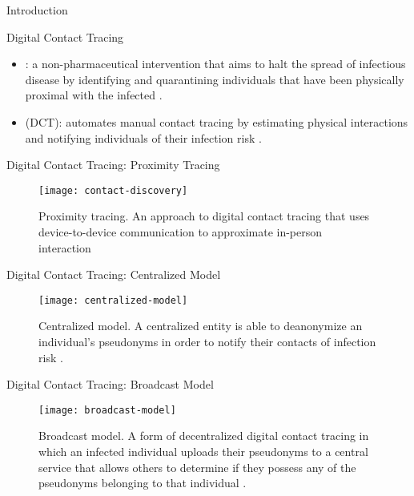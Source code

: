 \documentclass[11pt]{beamer}
\begin{document}
\begin{frame}
	\maketitle
\end{frame}

\begin{section}{Introduction}

\begin{frame}{Digital Contact Tracing}
\begin{itemize}
  \item {}: a non-pharmaceutical intervention that aims to halt the spread of infectious disease by identifying and quarantining individuals that have been physically proximal with the infected \citep{PozoMartin2023}.
  \item {} (DCT): automates manual contact tracing by estimating physical interactions and notifying individuals of their infection risk \citep{Reichert2021}.
\end{itemize}
\end{frame}

\begin{frame}{Digital Contact Tracing: Proximity Tracing}
\begin{figure}
  \centering
  \texttt{[image: contact-discovery]}
  \caption[Proximity tracing]{Proximity tracing. An approach to digital contact tracing that uses device-to-device communication to approximate in-person interaction \cite{Reichert2021}}
\end{figure}
\end{frame}

\begin{frame}{Digital Contact Tracing: Centralized Model}
\begin{figure}
  \centering
  \texttt{[image: centralized-model]}
  \caption[Centralized model]{Centralized model. A centralized entity is able to deanonymize an individual's pseudonyms in order to notify their contacts of infection risk \cite{Reichert2021}.}
\end{figure}
\end{frame}

\begin{frame}{Digital Contact Tracing: Broadcast Model}
\begin{figure}
  \centering
  \texttt{[image: broadcast-model]}
  \caption[Broadcast model]{Broadcast model. A form of decentralized digital contact tracing in which an infected individual uploads their pseudonyms to a central service that allows others to determine if they possess any of the pseudonyms belonging to that individual \cite{Reichert2021}.}
\end{figure}
\end{frame}


\end{section}
\end{document}
